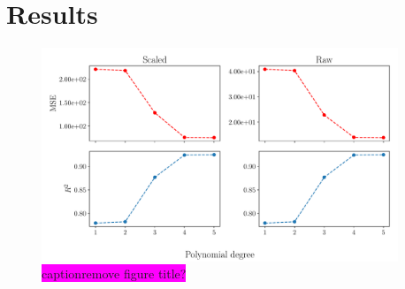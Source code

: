 \documentclass[aps,pra,english,notitlepage,reprint,nofootinbib]{revtex4-1}  %
\begin{document}



\section{Results}\label{sec:results}

\begin{figure}
  \vspace*{-5pt}
  \centering %
  \includegraphics[width=0.95\textwidth]{../figs/a_error_scaled_vs_raw.pdf}
  \caption{\colorbox{magenta}{caption}\colorbox{magenta}{remove figure title?}}\label{fig:a error scaled vs raw}
  \vspace*{-5pt}
\end{figure}
\end{document}
